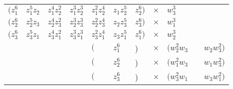 \documentclass{article}
\begin{document}
	\begin{table}[]
		\begin{tabular}{llllllll}
		$\bigg(z_{1}^{6}$ & $z_{1}^{5}z_{2}$ & $z_{1}^{4}z_{2}^{2}$ & $z_{1}^{3}z_{2}^{3}$ & $z_{1}^{2}z_{2}^{4}$ & $z_{1}z_{2}^{5}$ & $z_{2}^{6} \bigg)$ & $\times \quad w_{3}^{3}$ \\
		$\bigg(z_{2}^{6}$ & $z_{2}^{5}z_{3}$ & $z_{2}^{4}z_{3}^{2}$ & $z_{2}^{3}z_{3}^{3}$ & $z_{2}^{2}z_{3}^{4}$ & $z_{2}z_{3}^{5}$ & $z_{3}^{6} \bigg)$ & $\times \quad w_{1}^{3}$ \\
		$\bigg(z_{3}^{6}$ & $z_{3}^{5}z_{1}$ & $z_{3}^{4}z_{1}^{2}$ & $z_{3}^{3}z_{1}^{3}$ & $z_{3}^{2}z_{1}^{4}$ & $z_{3}z_{1}^{5}$ & $z_{1}^{6} \bigg)$ & $\times \quad w_{2}^{3}$ \\
		& & & & $\big($ & $z_{1}^{6}$ & \big)& $\times \quad \big( w_{2}^{2}w_{3} \qquad w_{2}w_{3}^{2} \big)$ \\
		& & & &  $\big($ & $z_{2}^{6}$ & \big)& $\times \quad \big( w_{1}^{2}w_{3} \qquad w_{1}w_{3}^{2} \big)$ \\
		& & & & $\big($ & $z_{3}^{6}$ & \big)& $\times \quad \big( w_{3}^{2}w_{1} \qquad w_{3}w_{1}^{2} \big)$ \\           
		\end{tabular}
	\end{table}

	
		
	
	
	
	

	
	
	
	
	
	
	
	
	
	  
	
	
\end{document}
